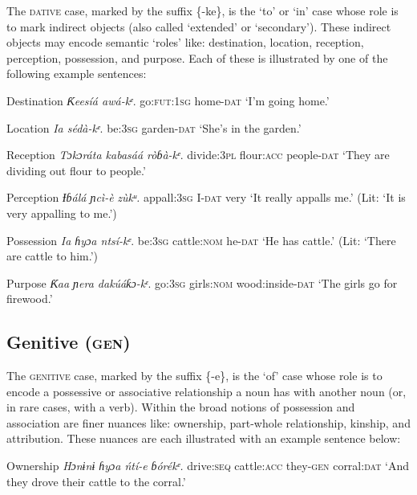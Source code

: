 The \textsc{dative} case, marked by the suffix \{-ke\}, is the ‘to’ or ‘in’ case whose role is to mark indirect objects (also called ‘extended’ or ‘secondary’). These indirect objects may encode semantic ‘roles’ like: destination, location, reception, perception, possession, and purpose. Each of these is illustrated by one of the following example sentences:




Destination
\textit{Ƙeesíá   awá-}\textit{kᵉ}.
go:\textsc{fut:1sg}   home-\textsc{dat}
‘I’m going home.’




Location
\textit{Ia     sédà-}\textit{kᵉ}.
be:\textsc{3sg}   garden-\textsc{dat}
‘She’s in the garden.’


Reception
\textit{Tɔkɔráta   kabasáá   ròɓà-}\textit{kᵉ}.
divide:\textsc{3pl}   flour:\textsc{acc}   people-\textsc{dat}
‘They are dividing out flour to people.’




Perception
\textit{Ɨɓálá     ɲcì-}\textit{è}\textit{   zùkᵘ.}
appall:\textsc{3sg}   I-\textsc{dat}   very
‘It really appalls me.’ (Lit: ‘It is very appalling to me.’)




Possession
\textit{Ia     ɦyɔa     ntsí-}\textit{kᵉ}.
be:\textsc{3sg}   cattle:\textsc{nom}    he-\textsc{dat}
‘He has cattle.’ (Lit: ‘There are cattle to him.’)




Purpose
\textit{Ƙaa     ɲera     dakúáƙɔ-}\textit{kᵋ}.
go:\textsc{3sg}   girls:\textsc{nom}   wood:inside-\textsc{dat}
‘The girls go for firewood.’






\subsection{Genitive (\textsc{gen})}


The \textsc{genitive} case, marked by the suffix \{-e\}, is the ‘of’ case whose role is to encode a possessive or associative relationship a noun has with another noun (or, in rare cases, with a verb). Within the broad notions of possession and association are finer nuances like: ownership, part-whole relationship, kinship, and attribution. These nuances are each illustrated with an example sentence below:




Ownership
\textit{Hɔnɨnɨ   ɦyɔa     ńtí-}\textit{e}\textit{     ɓórékᵉ.}
drive:\textsc{seq}   cattle:\textsc{acc}   they-\textsc{gen}   corral:\textsc{dat}
‘And they drove their cattle to the corral.’




